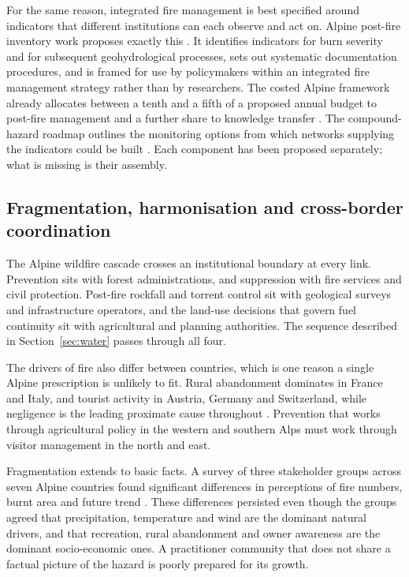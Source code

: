 \documentclass[11pt,a4paper]{article}
\begin{document}
For the same reason, integrated fire management is best specified around indicators that different institutions can each observe and act on. Alpine post-fire inventory work proposes exactly this \citep{melzner_wildfire-induced_2025}. It identifies indicators for burn severity and for subsequent geohydrological processes, sets out systematic documentation procedures, and is framed for use by policymakers within an integrated fire management strategy rather than by researchers. The costed Alpine framework already allocates between a tenth and a fifth of a proposed annual budget to post-fire management and a further share to knowledge transfer \citep{muller_forest_2020}. The compound-hazard roadmap outlines the monitoring options from which networks supplying the indicators could be built \citep{baselt_compound_2026}. Each component has been proposed separately; what is missing is their assembly.

\subsection{Fragmentation, harmonisation and cross-border coordination}

The Alpine wildfire cascade crosses an institutional boundary at every link. Prevention sits with forest administrations, and suppression with fire services and civil protection. Post-fire rockfall and torrent control sit with geological surveys and infrastructure operators, and the land-use decisions that govern fuel continuity sit with agricultural and planning authorities. The sequence described in Section~\ref{sec:water} passes through all four.

The drivers of fire also differ between countries, which is one reason a single Alpine prescription is unlikely to fit. Rural abandonment dominates in France and Italy, and tourist activity in Austria, Germany and Switzerland, while negligence is the leading proximate cause throughout \citep{muller_forest_2020}. Prevention that works through agricultural policy in the western and southern Alps must work through visitor management in the north and east.

Fragmentation extends to basic facts. A survey of three stakeholder groups across seven Alpine countries found significant differences in perceptions of fire numbers, burnt area and future trend \citep{hoang_stakeholders_2026}. These differences persisted even though the groups agreed that precipitation, temperature and wind are the dominant natural drivers, and that recreation, rural abandonment and owner awareness are the dominant socio-economic ones. A practitioner community that does not share a factual picture of the hazard is poorly prepared for its growth.
\end{document}
